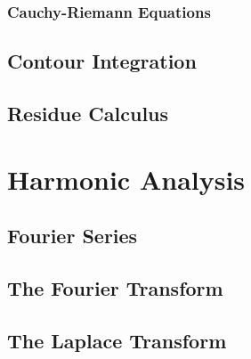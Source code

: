 \documentclass[10pt]{scrartcl}
\numberwithin{equation}{subsection}
\theoremstyle{definition}
\theoremstyle{remark}
\begin{document}
\subsubsection{Cauchy-Riemann Equations}
\subsection{Contour Integration}
\subsection{Residue Calculus}
\section{Harmonic Analysis}
\label{HarmonicAnalysis}
\subsection{Fourier Series}
\subsection{The Fourier Transform}
\subsection{The Laplace Transform}
\end{document}
